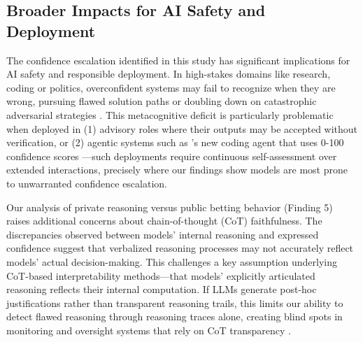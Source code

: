 \documentclass{article}
\begin{document}
\subsection{Broader Impacts for AI Safety and Deployment}

The confidence escalation identified in this study has significant implications for AI safety and responsible deployment. In high-stakes domains like research, coding or politics, overconfident systems may fail to recognize when they are wrong, pursuing flawed solution paths or doubling down on catastrophic adversarial strategies \citep{Rivera_2024}. This metacognitive deficit is particularly problematic when deployed in (1) advisory roles where their outputs may be accepted without verification, or (2) agentic systems such as \citet{cognitionlabs_devin21_2025}'s new coding agent that uses 0-100 confidence scores —such deployments require continuous self-assessment over extended interactions, precisely where our findings show models are most prone to unwarranted confidence escalation.

Our analysis of private reasoning versus public betting behavior (Finding 5) raises additional concerns about chain-of-thought (CoT) faithfulness. The discrepancies observed between models' internal reasoning and expressed confidence suggest that verbalized reasoning processes may not accurately reflect models' actual decision-making. This challenges a key assumption underlying CoT-based interpretability methods—that models' explicitly articulated reasoning reflects their internal computation. If LLMs generate post-hoc justifications rather than transparent reasoning trails, this limits our ability to detect flawed reasoning through reasoning traces alone, creating blind spots in monitoring and oversight systems that rely on CoT transparency \citep{lanham2023measuringfaithfulnesschainofthoughtreasoning,chua2025deepseekr1reasoningmodels}.
\end{document}
